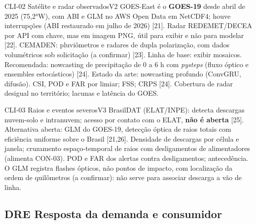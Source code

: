 \begin{ficha}{CLI-02 \textperiodcentered{} Satélite e radar observados}{V2}
 GOES-East é o \textbf{GOES-19} desde abril de 2025 (75,2°W),
com ABI e GLM no AWS Open Data em NetCDF4; houve interrupções (ABI restaurado
em julho de 2026) [21]. Radar REDEMET/DECEA por API com chave, mas em imagem
PNG, útil para exibir e não para modelar [22]. CEMADEN: pluviômetros e radares
de dupla polarização, com dados volumétricos sob solicitação (a confirmar)
[23].
 Linha de base: exibir mosaicos. Recomendada: nowcasting de
precipitação de 0 a 6 h com \emph{pysteps} (fluxo óptico e ensembles
estocásticos) [24]. Estado da arte: nowcasting profundo (ConvGRU, difusão).
 CSI, POD e FAR por limiar; FSS; CRPS [24].
 Cobertura de radar desigual no território; lacunas e
latência do GOES.
\end{ficha}

\begin{ficha}{CLI-03 \textperiodcentered{} Raios e eventos severos}{V3}
 BrasilDAT (ELAT/INPE): detecta descargas nuvem-solo e
intranuvem; acesso por contato com o ELAT, \textbf{não é aberta} [25].
Alternativa aberta: GLM do GOES-19, detecção óptica de raios totais com
eficiência uniforme sobre o Brasil [21,26].
 Densidade de descargas por célula e janela; cruzamento
espaço-temporal de raios com desligamentos de alimentadores (alimenta
CON-03).
 POD e FAR dos alertas contra desligamentos; antecedência.
 O GLM registra flashes ópticos, não pontos de impacto, com
localização da ordem de quilômetros (a confirmar): não serve para associar
descarga a vão de linha.
\end{ficha}

\subsection{DRE \textperiodcentered{} Resposta da demanda e consumidor}

